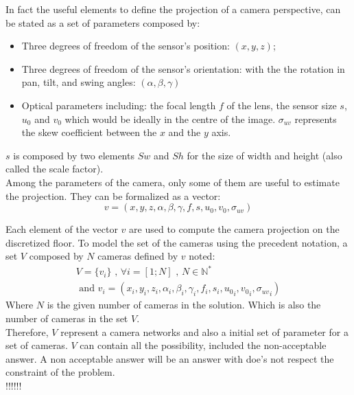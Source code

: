 In fact the useful elements to define the projection of a camera perspective, can be stated as a set of parameters composed by:\\
\begin{itemize}
\item Three degrees of freedom of the sensor’s position: $(x, y, z)$;
\item Three degrees of freedom of the sensor’s orientation: with the  the rotation in pan, tilt, and swing angles: $(\alpha,\beta, \gamma)$ 
\item Optical parameters including: the focal length $f$ of the lens, the sensor size $s$, $u_{0}$ and $v_0 $  which would be ideally in the centre of the image. $\sigma_{uv}$ represents the skew coefficient between the $x$ and the $y$ axis.
\end{itemize}
$s$ is composed by two elements $Sw$ and $Sh$ for the size of width and height (also called  the scale factor).\\

Among the parameters of the camera, only  some of them are useful to estimate the projection. They can be formalized as a vector:
\begin{equation}\label{eq:v}
v=(x,y,z,\alpha ,\beta,\gamma,f,s,u_0,v_0,\sigma_{uv})
\end{equation}

Each element of the vector $v$ are used to compute the camera projection on the discretized floor. 
\iffalse 
To model the set of the cameras using the precedent notation, a set $V$ composed by $N$ cameras defined by $v$ noted:
\begin{equation}\label{eq:V}
\begin{split}
V= \{v_i\} \mbox{  , } \forall i=[1;N] \mbox{ , } N\in \mathbb{N}^*
\\
\mbox{ and } v_i= (x_i,y_i,z_i,\alpha_i ,\beta_i,\gamma_i,f_i,s_i,{u_0}_i,{v_0}_i,{\sigma_{uv}}_i)
\end{split}
\end{equation}
\noindent Where $N$ is the given number of cameras in the solution. Which is also the number of cameras in the set $V$. \\
Therefore, $V$ represent a camera networks and also a initial set of parameter for a set of cameras. $V$ can contain all the possibility, included the non-acceptable answer. A non acceptable  answer will be an answer with  doe's not respect the constraint of the problem.   
 \\ !!!!!!\\

